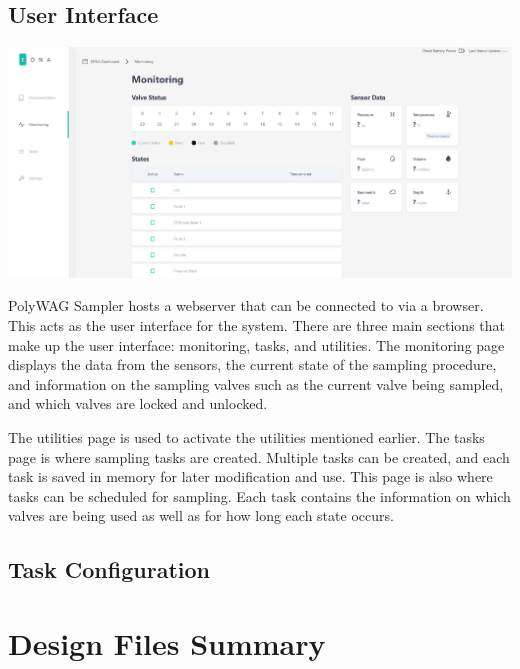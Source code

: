 \documentclass[11pt, letterpaper]{article}
\begin{document}
\subsection{User Interface}

\begin{center}
	\includegraphics[scale=0.35]{./Assets/UI.png}
\end{center}

PolyWAG Sampler hosts a webserver that can be connected to via a browser. This acts as the user interface for the system. There are three main sections that make up the user interface: monitoring, tasks, and utilities. The monitoring page displays the data from the sensors, the current state of the sampling procedure, and information on the sampling valves such as the current valve being sampled, and which valves are locked and unlocked. 


The utilities page is used to activate the utilities mentioned earlier. The tasks page is where sampling tasks are created. Multiple tasks can be created, and each task is saved in memory for later modification and use. This page is also where tasks can be scheduled for sampling. Each task contains the information on which valves are being used as well as for how long each state occurs. 


\subsection{Task Configuration}

\section{Design Files Summary}
%
%
\end{document}
